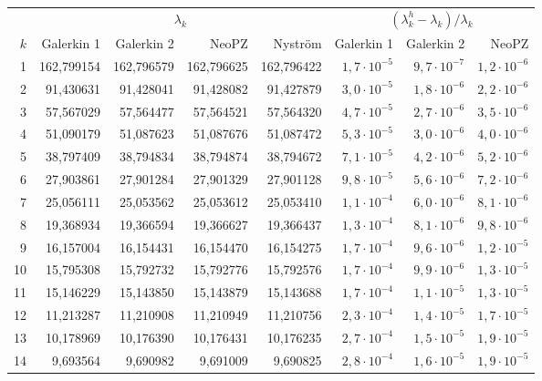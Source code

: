 \begin{tabular}{r rrrr rrr}
\toprule
 & \multicolumn{4}{c}{$\lambda_k$} & \multicolumn{3}{c}{$(\lambda_k^h - \lambda_k)/\lambda_k$} \\
\cmidrule(lr){2-5}\cmidrule(lr){6-8}
$k$ & Galerkin 1 & Galerkin 2 & NeoPZ & Nyström & Galerkin 1 & Galerkin 2 & NeoPZ \\
\midrule
1 & 162,799154 & 162,796579 & 162,796625 & 162,796422 & $1{,}7\cdot10^{-5}$ & $9{,}7\cdot10^{-7}$ & $1{,}2\cdot10^{-6}$ \\
2 & 91,430631 & 91,428041 & 91,428082 & 91,427879 & $3{,}0\cdot10^{-5}$ & $1{,}8\cdot10^{-6}$ & $2{,}2\cdot10^{-6}$ \\
3 & 57,567029 & 57,564477 & 57,564521 & 57,564320 & $4{,}7\cdot10^{-5}$ & $2{,}7\cdot10^{-6}$ & $3{,}5\cdot10^{-6}$ \\
4 & 51,090179 & 51,087623 & 51,087676 & 51,087472 & $5{,}3\cdot10^{-5}$ & $3{,}0\cdot10^{-6}$ & $4{,}0\cdot10^{-6}$ \\
5 & 38,797409 & 38,794834 & 38,794874 & 38,794672 & $7{,}1\cdot10^{-5}$ & $4{,}2\cdot10^{-6}$ & $5{,}2\cdot10^{-6}$ \\
6 & 27,903861 & 27,901284 & 27,901329 & 27,901128 & $9{,}8\cdot10^{-5}$ & $5{,}6\cdot10^{-6}$ & $7{,}2\cdot10^{-6}$ \\
7 & 25,056111 & 25,053562 & 25,053612 & 25,053410 & $1{,}1\cdot10^{-4}$ & $6{,}0\cdot10^{-6}$ & $8{,}1\cdot10^{-6}$ \\
8 & 19,368934 & 19,366594 & 19,366627 & 19,366437 & $1{,}3\cdot10^{-4}$ & $8{,}1\cdot10^{-6}$ & $9{,}8\cdot10^{-6}$ \\
9 & 16,157004 & 16,154431 & 16,154470 & 16,154275 & $1{,}7\cdot10^{-4}$ & $9{,}6\cdot10^{-6}$ & $1{,}2\cdot10^{-5}$ \\
10 & 15,795308 & 15,792732 & 15,792776 & 15,792576 & $1{,}7\cdot10^{-4}$ & $9{,}9\cdot10^{-6}$ & $1{,}3\cdot10^{-5}$ \\
11 & 15,146229 & 15,143850 & 15,143879 & 15,143688 & $1{,}7\cdot10^{-4}$ & $1{,}1\cdot10^{-5}$ & $1{,}3\cdot10^{-5}$ \\
12 & 11,213287 & 11,210908 & 11,210949 & 11,210756 & $2{,}3\cdot10^{-4}$ & $1{,}4\cdot10^{-5}$ & $1{,}7\cdot10^{-5}$ \\
13 & 10,178969 & 10,176390 & 10,176431 & 10,176235 & $2{,}7\cdot10^{-4}$ & $1{,}5\cdot10^{-5}$ & $1{,}9\cdot10^{-5}$ \\
14 & 9,693564 & 9,690982 & 9,691009 & 9,690825 & $2{,}8\cdot10^{-4}$ & $1{,}6\cdot10^{-5}$ & $1{,}9\cdot10^{-5}$ \\

\end{tabular}

